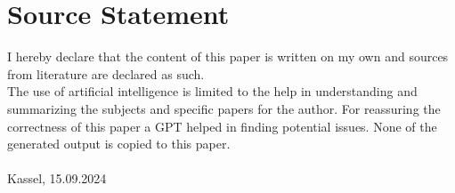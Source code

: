 \section{Source Statement}
I hereby declare that the content of this paper is written on my own and sources from literature are declared as such.\\
The use of artificial intelligence is limited to the help in understanding and summarizing the subjects and specific papers for the author. For reassuring the correctness of this paper a GPT helped in finding potential issues. None of the generated output is copied to this paper. \vspace{3cm}\\
\underline{\hspace{10cm}}\\
\footnotesize Kassel, 15.09.2024 \normalsize
